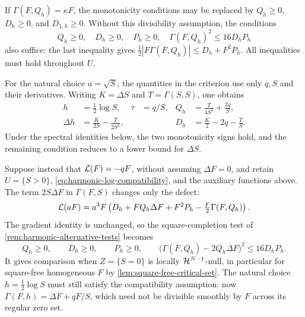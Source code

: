 \begin{remark}
\label{rem:harmonic-alternative-tests}
If \(\Gamma(F,Q_h)=\kappa F\), the monotonicity conditions may be replaced by
\(Q_h\ge0\), \(D_h\ge0\), and \(D_{1,h}\ge0\).
Without this divisibility assumption, the conditions
\[
 Q_h\ge0,\quad D_h\ge0,\quad P_h\ge0,\quad
 \Gamma(F,Q_h)^2\le16D_hP_h
\]
also suffice: the last inequality gives
\(\tfrac12|F\Gamma(F,Q_h)|\le D_h+F^2P_h\).
All inequalities must hold throughout \(U\).
\end{remark}

For the natural choice \(a=\sqrt S\),
the quantities in the criterion use only \(q,S\) and their derivatives. Writing
\(K=\Delta S\) and \(T=\Gamma(S,S)\), one obtains
\begin{equation}\label{eq:harmonic-gradient-multiplier-data}
 \begin{aligned}
 h&=\tfrac12\log S,& \tau&=q/S,&
 Q_h&=\frac{T}{4S^2}+\frac{2q}{S},\\
 \Delta h&=\frac{K}{2S}-\frac{T}{2S^2},&&&
 D_h&=\frac K2-2q-\frac TS.
 \end{aligned}
\end{equation}
Under the spectral identities below, the two monotonicity signs hold,
and the remaining condition reduces to a lower bound for \(\Delta S\).

\begin{remark}
\label{rem:nonharmonic-log-multiplier}
Suppose instead that \(\mathcal L(F)=-qF\), without assuming
\(\Delta F=0\), and retain \(U=\{S>0\}\),
\eqref{eq:harmonic-log-compatibility}, and the auxiliary functions above.
The term \(2S\Delta F\) in \(\Gamma(F,S)\) changes only the defect:
\[
 \mathcal L(aF)=a^3F\left(D_h+FQ_h\Delta F+F^2P_h
                         -\tfrac F2\Gamma(F,Q_h)\right).
\]
The gradient identity is unchanged, so the square-completion test of
\cref{rem:harmonic-alternative-tests} becomes
\[
 Q_h\ge0,\qquad D_h\ge0,\qquad P_h\ge0,\qquad
 \bigl(\Gamma(F,Q_h)-2Q_h\Delta F\bigr)^2\le16D_hP_h.
\]
It gives comparison when \(Z=\{S=0\}\) is locally
\(\mathcal H^{N-1}\)-null, in particular for square-free homogeneous \(F\)
by \cref{lem:square-free-critical-set}. The natural choice
\(h=\frac12\log S\) must still satisfy the compatibility assumption:
now \(\Gamma(F,h)=\Delta F+qF/S\), which need not be divisible
smoothly by \(F\) across its regular zero set.
\end{remark}
